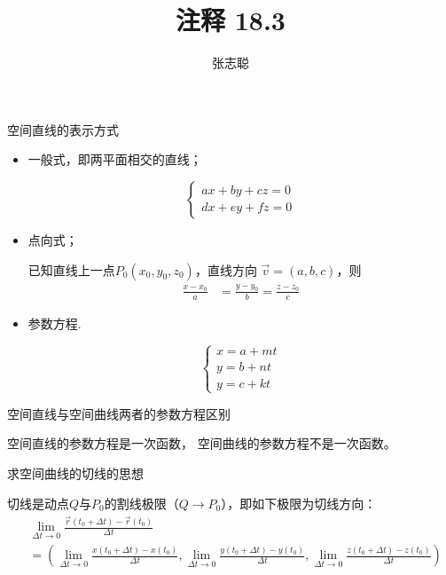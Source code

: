 \documentclass{article}
\begin{document}
\title{注释 18.3}
\author{张志聪}
\maketitle
\begin{zremark}
  空间直线的表示方式
\end{zremark}

\begin{itemize}
  \item 一般式，即两平面相交的直线；

        \begin{equation*}
          \begin{cases}
            a x + b y + c z = 0 \\
            d x + e y + f z = 0
          \end{cases}
        \end{equation*}
  \item 点向式；

        已知直线上一点$P_0(x_0, y_0, z_0)$，直线方向
        $\vec{v} = (a, b, c)$，则
        \begin{align*}
          \frac{x - x_0}{a} & = \frac{y - y_0}{b} = \frac{z - z_0}{c}
        \end{align*}

  \item 参数方程.

        \begin{equation*}
          \begin{cases}
            x = a + mt \\
            y = b + nt \\
            y = c + kt
          \end{cases}
        \end{equation*}
\end{itemize}

\begin{zremark}
  空间直线与空间曲线两者的参数方程区别
\end{zremark}
空间直线的参数方程是一次函数，
空间曲线的参数方程不是一次函数。

\begin{zremark}
  求空间曲线的切线的思想
\end{zremark}

切线是动点$Q$与$P_0$的割线极限（$Q \to P_0$），即如下极限为切线方向：
\begin{align*}
   & \lim\limits_{\Delta t \to 0} \frac{\vec{r}(t_0 + \Delta t) - \vec{r}(t_0)}{\Delta t} \\
   & = \left(
  \lim\limits_{\Delta t \to 0} \frac{x(t_0 + \Delta t) - x(t_0)}{\Delta t} ,
  \lim\limits_{\Delta t \to 0} \frac{y(t_0 + \Delta t) - y(t_0)}{\Delta t},
  \lim\limits_{\Delta t \to 0} \frac{z(t_0 + \Delta t) - z(t_0)}{\Delta t}
  \right)
\end{align*}
\end{document}
